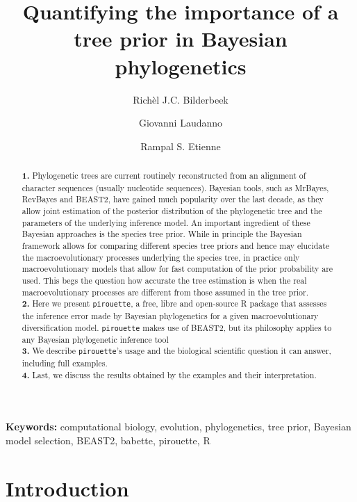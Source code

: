\documentclass{article}
\title{
  Quantifying the importance of a tree prior in Bayesian phylogenetics
}
\author[1]{Rich\`el J.C. Bilderbeek}
\author[1]{Giovanni Laudanno}
\author[1]{Rampal S. Etienne}
\affil[1]{Groningen Institute for Evolutionary Life Sciences, University of 
Groningen, Groningen, The Netherlands}
\begin{document}
\maketitle

\begin{abstract}

  \textbf{1. }
    Phylogenetic trees are current routinely reconstructed from an alignment of character sequences (usually nucleotide sequences). Bayesian tools, such as MrBayes, RevBayes and BEAST2, have gained much popularity over the last decade, as they allow joint estimation of the posterior distribution of the phylogenetic tree and the parameters of the underlying inference model.  
    An important ingredient of these Bayesian approaches is the species tree prior. While in principle the Bayesian framework allows for comparing different species tree priors and hence may elucidate the macroevolutionary processes underlying the species tree, in practice only 
    macroevolutionary models that allow for fast computation of the prior probability are used. 
    This begs the question how accurate the tree estimation is 
    when the real macroevolutionary processes are different 
    from those assumed in the tree prior. \\
  \textbf{2. }
    Here we present \verb;pirouette;, 
    a free, libre and open-source R package that assesses 
    the inference error made by Bayesian phylogenetics for a given macroevolutionary diversification model. \verb;pirouette; makes use of BEAST2, but its philosophy applies to any Bayesian phylogenetic inference tool\\
  \textbf{3. }
    We describe \verb;pirouette;'s usage and the biological scientific
    question it can answer, including full examples. \\
  \textbf{4. }
    Last, we discuss the results obtained by the examples and their interpretation. \\
\end{abstract}

{\bf Keywords:} computational biology, evolution, phylogenetics, tree prior,
  Bayesian model selection, BEAST2, babette, pirouette, R

\section{Introduction}
\end{document}
